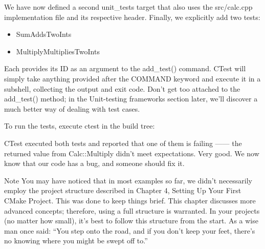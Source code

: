 We have now defined a second unit\_tests target that also uses the src/calc.cpp implementation file and its respective header. Finally, we explicitly add two tests:

\begin{itemize}
\item
SumAddsTwoInts

\item
MultiplyMultipliesTwoInts
\end{itemize}

Each provides its ID as an argument to the add\_test() command. CTest will simply take anything provided after the COMMAND keyword and execute it in a subshell, collecting the output and exit code. Don’t get too attached to the add\_test() method; in the Unit-testing frameworks section later, we’ll discover a much better way of dealing with test cases.

To run the tests, execute ctest in the build tree:


CTest executed both tests and reported that one of them is failing —— the returned value from Calc::Multiply didn’t meet expectations. Very good. We now know that our code has a bug, and someone should fix it.

\begin{myNotic}{Note}
You may have noticed that in most examples so far, we didn’t necessarily employ the project structure described in Chapter 4, Setting Up Your First CMake Project. This was done to keep things brief. This chapter discusses more advanced concepts; therefore, using a full structure is warranted. In your projects (no matter how small), it’s best to follow this structure from the start. As a wise man once said: “You step onto the road, and if you don’t keep your feet, there’s no knowing where you might be swept off to.”
\end{myNotic}

